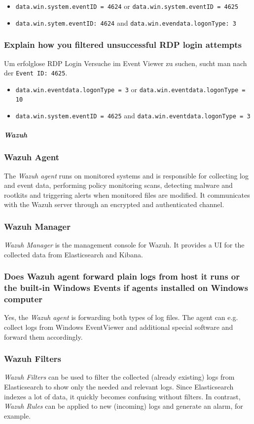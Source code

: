 \begin{itemize}
    \item \lstinline|data.win.system.eventID = 4624| or \lstinline|data.win.system.eventID = 4625|
    \item \lstinline|data.win.sytem.eventID: 4624| and \lstinline|data.win.evendata.logonType: 3|
\end{itemize}

\subsubsection{Explain how you filtered unsuccessful RDP login attempts}
Um erfolglose RDP Login Versuche im Event Viewer zu suchen, sucht man nach der \lstinline|Event ID: 4625|.\\

\begin{itemize}
    \item \lstinline|data.win.eventdata.logonType = 3| or \lstinline|data.win.eventdata.logonType = 10|
    \item \lstinline|data.win.system.eventID = 4625| and \lstinline|data.win.eventdata.logonType = 3|
\end{itemize}

\subparagraph{Wazuh}

\subsubsection{Wazuh Agent}
The \textit{Wazuh agent} runs on monitored systems and is responsible for collecting log and event data, performing policy monitoring scans, detecting malware and rootkits and triggering alerts when monitored files are modified. It communicates with the Wazuh server through an encrypted and authenticated channel.

\subsubsection{Wazuh Manager}
\textit{Wazuh Manager} is the management console for Wazuh. It provides a UI for the collected data from Elasticsearch and Kibana.

\subsubsection{Does Wazuh agent forward plain logs from host it runs or the built-in Windows Events if agents installed on Windows computer}
Yes, the \textit{Wazuh agent} is forwarding both types of log files. The agent can e.g. collect logs from Windows EventViewer and additional special software and forward them accordingly.

\subsubsection{Wazuh Filters}
\textit{Wazuh Filters} can be used to filter the collected (already existing) logs from Elasticsearch to show only the needed and relevant logs. Since Elasticsearch indexes a lot of data, it quickly becomes confusing without filters.
In contrast, \textit{Wazuh Rules} can be applied to new (incoming) logs and generate an alarm, for example.
